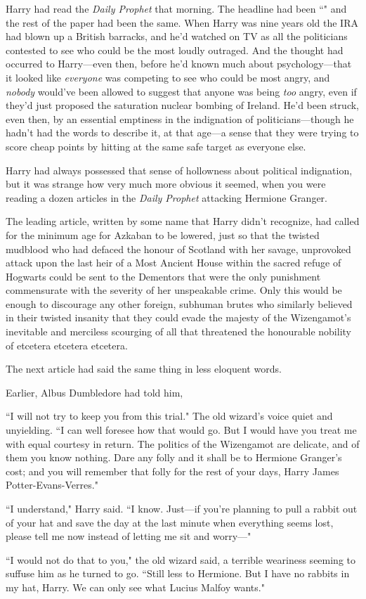 Harry had read the \emph{Daily Prophet} that morning. The headline had been ``" and the rest of the paper had been the same. When Harry was nine years old the IRA had blown up a British barracks, and he'd watched on TV as all the politicians contested to see who could be the most loudly outraged. And the thought had occurred to Harry—even then, before he'd known much about psychology—that it looked like \emph{everyone} was competing to see who could be most angry, and \emph{nobody} would've been allowed to suggest that anyone was being \emph{too} angry, even if they'd just proposed the saturation nuclear bombing of Ireland. He'd been struck, even then, by an essential emptiness in the indignation of politicians—though he hadn't had the words to describe it, at that age—a sense that they were trying to score cheap points by hitting at the same safe target as everyone else.

Harry had always possessed that sense of hollowness about political indignation, but it was strange how very much more obvious it seemed, when you were reading a dozen articles in the \emph{Daily Prophet} attacking Hermione Granger.

The leading article, written by some name that Harry didn't recognize, had called for the minimum age for Azkaban to be lowered, just so that the twisted mudblood who had defaced the honour of Scotland with her savage, unprovoked attack upon the last heir of a Most Ancient House within the sacred refuge of Hogwarts could be sent to the Dementors that were the only punishment commensurate with the severity of her unspeakable crime. Only this would be enough to discourage any other foreign, subhuman brutes who similarly believed in their twisted insanity that they could evade the majesty of the Wizengamot's inevitable and merciless scourging of all that threatened the honourable nobility of etcetera etcetera etcetera.

The next article had said the same thing in less eloquent words.

Earlier, Albus Dumbledore had told him,

\begin{em}
``I will not try to keep you from this trial." The old wizard's voice quiet and unyielding. ``I can well foresee how that would go. But I would have you treat me with equal courtesy in return. The politics of the Wizengamot are delicate, and of them you know nothing. Dare any folly and it shall be to Hermione Granger's cost; and you will remember that folly for the rest of your days, Harry James Potter-Evans-Verres."

``I understand," Harry said. ``I know. Just—if you're planning to pull a rabbit out of your hat and save the day at the last minute when everything seems lost, please tell me now instead of letting me sit and worry—"

``I would not do that to you," the old wizard said, a terrible weariness seeming to suffuse him as he turned to go. ``Still less to Hermione. But I have no rabbits in my hat, Harry. We can only see what Lucius Malfoy wants."
\end{em}

